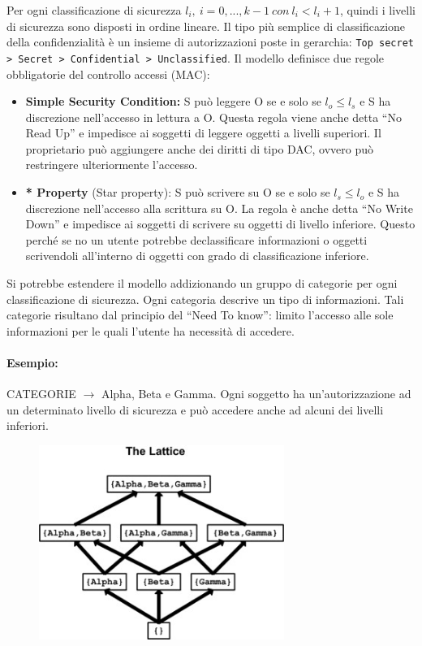 Per ogni classificazione di sicurezza \(l_i, \ i=0,...,k-1 \ con \ l_i<l_i+1\),
quindi i livelli di sicurezza sono
disposti in ordine lineare.
Il tipo più semplice di classificazione della confidenzialità è un insieme di
autorizzazioni poste in
gerarchia: \verb|Top secret > Secret > Confidential > Unclassified|.
Il modello definisce due regole obbligatorie del controllo accessi (MAC):
\begin{itemize}
    \item \textbf{Simple Security Condition:} S può leggere O se e solo se
          \(l_o \le l_s\) e S ha discrezione
          nell'accesso in lettura a O. Questa regola viene anche detta “No Read Up”
          e impedisce ai
          soggetti di leggere oggetti a livelli superiori. Il proprietario può
          aggiungere anche dei diritti di
          tipo DAC, ovvero può restringere ulteriormente l'accesso.
    \item \textbf{* Property} (Star property): S può scrivere su O se e solo
          se \(l_s \le l_o\) e S ha discrezione
          nell'accesso alla scrittura su O. La regola è anche detta “No Write Down”
          e impedisce ai
          soggetti di scrivere su oggetti di livello inferiore. Questo perché se no
          un utente potrebbe declassificare
          informazioni o oggetti scrivendoli all'interno di oggetti con grado di
          classificazione inferiore.
\end{itemize}

Si potrebbe estendere il modello addizionando un gruppo di categorie per ogni
classificazione di
sicurezza. Ogni categoria descrive un tipo di informazioni.
Tali categorie risultano dal principio del “Need To know”: limito l'accesso alle
sole informazioni per
le quali l'utente ha necessità di accedere.

\paragraph{Esempio:}
CATEGORIE \(\rightarrow\) Alpha, Beta e Gamma.
Ogni soggetto ha un'autorizzazione ad un determinato livello di sicurezza e può
accedere anche
ad alcuni dei livelli inferiori.

\begin{figure}[H]
    \centering
    \includegraphics[width=8cm, keepaspectratio]{capitoli/policy/imgs/Lattuce.jpg}
\end{figure}

